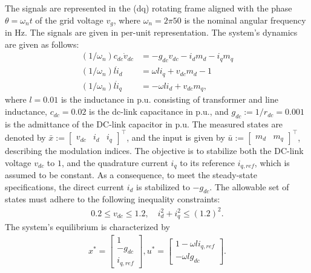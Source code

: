 \documentclass[lettersize,journal]{IEEEtran}
\begin{document}
The signals are represented in the (dq) rotating frame aligned with the phase $\theta = \omega_n t$ of the grid voltage $v_g$, where $\omega_n = 2 \pi 50$ is the nominal angular frequency in Hz.
The signals are given in per-unit representation.
The system's dynamics are given as follows:
\begin{subequations} \label{eq:power_converter_system_model}
\begin{align}
   (1/\omega_n) c_{dc} \dot v_{dc} &= - g_{dc} v_{dc} - i_d m_d - i_q m_q \\
   (1/\omega_n) l \dot i_d &= \omega l i_q + v_{dc} m_d - 1 \\
   (1/\omega_n) l \dot i_q &= -\omega l i_d + v_{dc} m_q,
\end{align}
\end{subequations}
where $l = 0.01$ is the inductance in p.u. consisting of transformer and line inductance, $c_{dc} = 0.02$ is the dc-link capacitance in p.u., and $g_{dc} := 1/r_{dc} = 0.001$ is the admittance of the DC-link capacitor in p.u.
The measured states are denoted by $\bar x := [\begin{matrix}v_{dc} & i_d & i_q\end{matrix}]^\top$, and the input is given by $\bar u := [\begin{matrix}m_d & m_q\end{matrix}]^\top$, describing the modulation indices.
The objective is to stabilize both the DC-link voltage $v_{dc}$ to $1$, and the quadrature current $i_q$ to its reference $i_{q,ref}$, which is assumed to be constant.
As a consequence, to meet the steady-state specifications, the direct current $i_d$ is stabilized to $-g_{dc}$.
The allowable set of states must adhere to the following inequality constraints:
\begin{align} \label{eq:power_converter_state_constraints}
   0.2 \leq v_{dc} \leq 1.2, \quad i_d^2 + i_q^2 \leq (1.2)^2.
\end{align}
The system's equilibrium is characterized by
\begin{align*}
   x^* = \begin{bmatrix}
      1 \\ -g_{dc} \\ i_{q,ref}
   \end{bmatrix},
   u^* = \begin{bmatrix}
      1 - \omega l i_{q,ref} \\ -\omega l g_{dc}
   \end{bmatrix}.
\end{align*}
\end{document}

